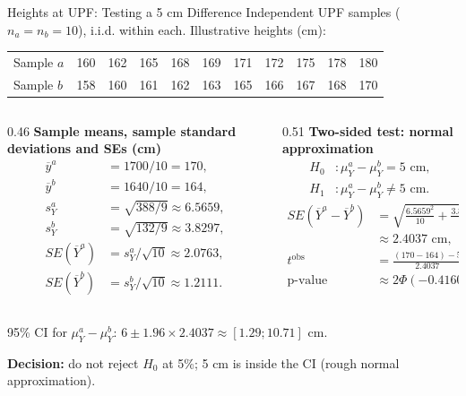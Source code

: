 \documentclass[notes,10pt, aspectratio=169]{beamer}
\begin{document}
\begin{frame}{Heights at UPF: Testing a 5 cm Difference}
\small
Independent UPF samples ($n_a=n_b=10$), i.i.d. within each. Illustrative heights (cm):
\begin{center}
\setlength{\tabcolsep}{8pt}
\begin{tabular}{lcccccccccc}
\toprule
Sample $a$ & 160 & 162 & 165 & 168 & 169 & 171 & 172 & 175 & 178 & 180 \\
Sample $b$ & 158 & 160 & 161 & 162 & 163 & 165 & 166 & 167 & 168 & 170 \\
\bottomrule
\end{tabular}
\end{center}
\smallskip
\begin{columns}[T,onlytextwidth]
\begin{column}{0.46\textwidth}
\textbf{Sample means, sample standard deviations and SEs (cm)}
\[
\begin{aligned}
    \overline{y}^a&=1700/10=170,\\
    \overline{y}^b&=1640/10=164,\\
    s_Y^a&=\sqrt{388/9}\approx6.5659,\\
    s_Y^b&=\sqrt{132/9}\approx3.8297,\\
    SE(\overline{Y}^a)&=s_Y^a/\sqrt{10}\approx2.0763,\\
    SE(\overline{Y}^b)&=s_Y^b/\sqrt{10}\approx1.2111.
\end{aligned}
\]
\end{column}
\begin{column}{0.51\textwidth}
\textbf{Two-sided test: normal approximation}
\[
\begin{aligned}
    H_0 &: \mu_Y^a-\mu_Y^b=5\text{ cm},\\
    H_1 &: \mu_Y^a-\mu_Y^b\neq5\text{ cm}.
\end{aligned}
\]
\[
\begin{aligned}
    SE(\overline{Y}^a-\overline{Y}^b)
    &=\sqrt{\frac{6.5659^2}{10}+\frac{3.8297^2}{10}}\\
    &\approx2.4037\text{ cm},\\
    t^{\mathrm{obs}}&=\frac{(170-164)-5}{2.4037}\approx0.4160,\\
    \text{p-value}&\approx2\Phi(-0.4160)\approx0.6774.
\end{aligned}
\]
\end{column}
\end{columns}
95\% CI for $\mu_Y^a-\mu_Y^b$: $6\pm1.96\times2.4037\approx[1.29;10.71]$ cm.

\textbf{Decision:} do not reject $H_0$ at 5\%; 5 cm is inside the CI (rough normal approximation).
\end{frame}
\end{document}
